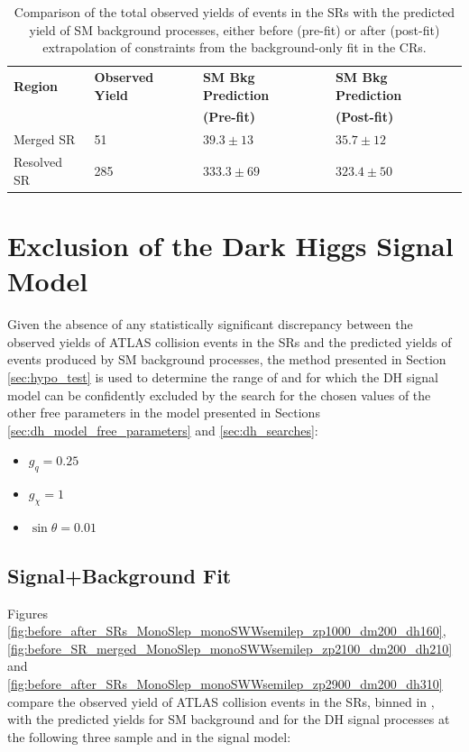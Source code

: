 \begin{table}
\centering
\caption{Comparison of the total observed yields of events in the SRs with the predicted yield of SM background processes, either before (pre-fit) or after (post-fit) extrapolation of constraints from the background-only fit in the CRs.}
\label{tab:pre_post_yields_SR}
\begin{tabular}{l l l l}
\toprule
\textbf{Region} & \textbf{Observed Yield} & \textbf{SM Bkg Prediction} & \textbf{SM Bkg Prediction} \\
 & & \textbf{(Pre-fit)} & \textbf{(Post-fit)} \\
\midrule
\midrule
Merged SR & 51 & $39.3 \pm 13$ & $35.7 \pm 12$ \\
\midrule
Resolved SR & 285 & $333.3\pm 69$ & $323.4 \pm 50$ \\
\bottomrule
\end{tabular}
\end{table}



\section{Exclusion of the Dark Higgs Signal Model}

Given the absence of any statistically significant discrepancy between the observed yields of ATLAS collision events in the SRs and the predicted yields of events produced by SM background processes, the method presented in Section \ref{sec:hypo_test} is used to determine the range of \ms and \mZp for which the DH signal model can be confidently excluded by the search for the chosen values of the other free parameters in the model presented in Sections \ref{sec:dh_model_free_parameters} and \ref{sec:dh_searches}:

\begin{itemize}
\item \(g_q=0.25\)
\item \(g_\chi=1\)
\item \(\sin\theta=0.01\)
\end{itemize}

\subsection{Signal+Background Fit}

Figures \ref{fig:before_after_SRs_MonoSlep_monoSWWsemilep_zp1000_dm200_dh160}, \ref{fig:before_SR_merged_MonoSlep_monoSWWsemilep_zp2100_dm200_dh210} and \ref{fig:before_after_SRs_MonoSlep_monoSWWsemilep_zp2900_dm200_dh310} compare the observed yield of ATLAS collision events in the SRs, binned in \minms, with the predicted yields for SM background and for the DH signal processes at the following three sample \ms and \mZp in the signal model:

